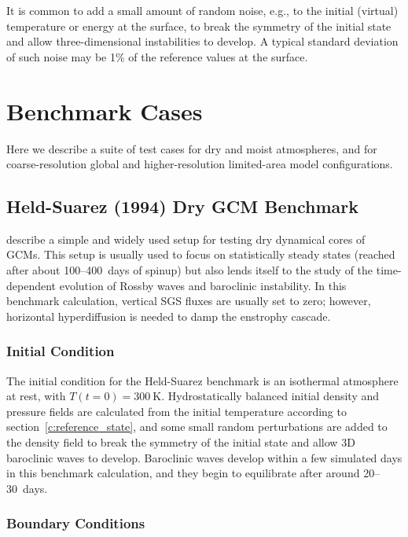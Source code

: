 \documentclass{report}
\begin{document}
It is common to add a small amount of random noise, e.g., to the initial (virtual) temperature or energy at the surface, to break the symmetry of the initial state and allow three-dimensional instabilities to develop. A typical standard deviation of such noise may be 1\% of the reference values at the surface.

\chapter{Benchmark Cases}\label{c:benchmarks}

Here we describe a suite of test cases for dry and moist atmospheres, and for coarse-resolution global and higher-resolution limited-area model configurations. 

\section{Held-Suarez (1994) Dry GCM Benchmark}

\citet{Held94} describe a simple and widely used setup for testing dry dynamical cores of GCMs. This setup is usually used to focus on statistically steady states (reached after about 100--400~days of spinup) but also lends itself to the study of the time-dependent evolution of Rossby waves and baroclinic instability. In this benchmark calculation, vertical SGS fluxes are usually set to zero; however, horizontal hyperdiffusion is needed to damp the enstrophy cascade. 

\subsection{Initial Condition}

The initial condition for the Held-Suarez benchmark is an isothermal atmosphere at rest, with $T(t=0) = 300~\mathrm{K}$. Hydrostatically balanced initial density and pressure fields are calculated from the initial temperature according to section~\ref{c:reference_state}, and some small random perturbations are added to the density field to break the symmetry of the initial state and allow 3D baroclinic waves to develop. Baroclinic waves develop within a few simulated days in this benchmark calculation, and they begin to equilibrate after around 20--30~days. 

\subsection{Boundary Conditions}
\end{document}

